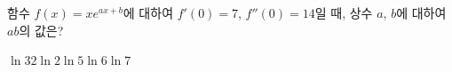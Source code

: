 함수 $f(x)=xe^{ax+b}$에 대하여 $f'(0)=7$, $f''(0)=14$일 때, 상수 $a$, $b$에 대하여 $ab$의 값은?
\begin{choices32}{$\ln 3$}{$2\ln 2$}{$\ln 5$}{$\ln 6$}{$\ln 7$}\end{choices32}
